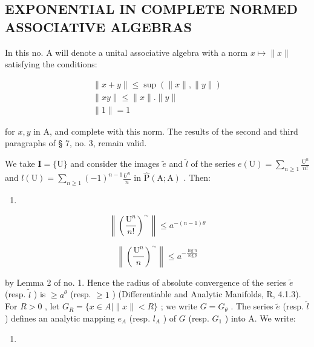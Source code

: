 \subsection{EXPONENTIAL IN COMPLETE NORMED ASSOCIATIVE ALGEBRAS}

In this no. A will denote a unital associative algebra with a norm \(x \mapsto \| x \|\) satisfying the conditions:

\[
\begin{array}{c} \| x + y \| \leqslant \sup (\| x \|, \| y \|) \\ \| x y \| \leqslant \| x \|. \| y \| \\ \| 1 \| = 1 \end{array}
\]

for \(x, y\) in A, and complete with this norm. The results of the second and third paragraphs of § 7, no. 3, remain valid.

We take \(\mathbf{I} = \{\mathrm{U}\}\) and consider the images \(\tilde e\) and \(\tilde{l}\) of the series \(e(\mathrm{U}) = \sum_{n\geqslant 1}\frac{\mathrm{U}^n}{n!}\) and \(l(\mathrm{U}) = \sum_{n\geqslant 1}(-1)^{n - 1}\frac{U^n}{n}\) in \(\hat{\mathrm{P}} (\mathrm{A};\mathrm{A})\) . Then:

\begin{enumerate}
\def\labelenumi{(\arabic{enumi})}
\setcounter{enumi}{19}
\tightlist
\item
\end{enumerate}

\[
\left\| \left(\frac {\mathrm{U} ^ {n}}{n !}\right) ^ {\sim} \right\| \leqslant a ^ {- (n - 1) \theta}\tag{20}
\]

\[
\left\| \left(\frac {\mathrm{U} ^ {n}}{n}\right) ^ {\sim} \right\| \leqslant a ^ {- \frac {\log n}{\log p}}\tag{21}
\]

by Lemma 2 of no. 1. Hence the radius of absolute convergence of the series \(\tilde{e}\) (resp. \(\tilde{l}\) ) is \(\geqslant a^\theta\) (resp. \(\geqslant 1\) ) (Differentiable and Analytic Manifolds, R, 4.1.3). For \(R > 0\) , let \(G_R = \{x \in A \mid \|x\|<R\}\) ; we write \(G = G_\theta\) . The series \(\tilde{e}\) (resp. \(\tilde{l}\) ) defines an analytic mapping \(e_{A}\) (resp. \(l_{A}\) ) of \(G\) (resp. \(G_{1}\) ) into A. We write:

\begin{enumerate}
\def\labelenumi{(\arabic{enumi})}
\setcounter{enumi}{21}
\tightlist
\item
\end{enumerate}

